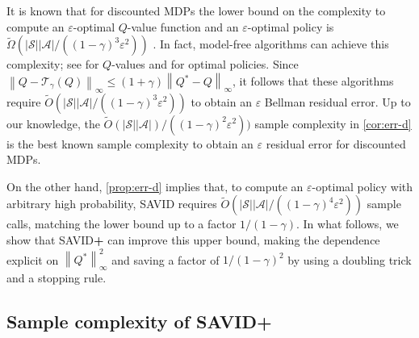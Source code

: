 \documentclass{article}
\newcommand{\cA}{\mathcal{A}}
\newcommand{\cS}{\mathcal{S}}
\newcommand{\T}{\mathcal{T}}
\newcommand*{\infn}[1]{\left\|{#1}\right\|_{\infty}}
\theoremstyle{plain}
\theoremstyle{definition}
\theoremstyle{remark}
\begin{document}
It is known that for discounted MDPs the lower bound on the complexity to compute an $\varepsilon$-optimal $Q$-value function and an $\varepsilon$-optimal policy is $\widetilde\Omega(|\cS||\cA|/((1\!-\!\gamma)^3\varepsilon^{2}))$ \citep{gheshlaghi2013minimax}. In fact, model-free algorithms can achieve this complexity; see \cite{wainwright2019variance} for $Q$-values and \cite{sidford2018near} for  optimal policies.
Since $\infn{Q-\T_\gamma(Q)} \le (1\!+\!\gamma) \infn{Q^*-Q}$, it follows that these algorithms require $\widetilde O(|\cS||\cA| /((1\!-\!\gamma)^3\varepsilon^{2}))$ to obtain an $\varepsilon$ Bellman residual error. Up to our knowledge, the $\widetilde{O}(|\cS||\cA|)/((1\!-\!\gamma)^2\varepsilon^{2}))$ sample complexity in \cref{cor:err-d} is the best known sample complexity to obtain an $\varepsilon$ residual error for discounted MDPs. 
 
On the other hand, \cref{prop:err-d} implies that, to compute an $\varepsilon$-optimal policy with arbitrary high probability, {\rm SAVID} requires $\widetilde{O}(|\cS||\cA|/((1\!-\!\gamma)^4\varepsilon^{2}))$ sample calls, matching the lower bound up to a factor $1/(1\!-\!\gamma)$. In what follows, we show that {\rm SAVID}\textbf{+} can improve this upper bound, making the dependence explicit on $\infn{Q^*}^2$ and saving a factor of $1/(1\!-\!\gamma)^2$ by using a doubling trick and a stopping rule.
 
\subsection{Sample complexity of {\rm SAVID}\textbf{+}}\label{Se:complexity2-d}
\end{document}
